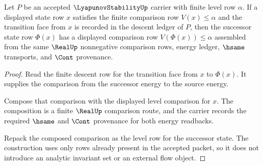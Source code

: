 \begin{theorem}
\label{thm:lyapunovstability-level-set-containment}
Let $P$ be an accepted $\LyapunovStabilityUp$ carrier with finite level row $\alpha$. If a displayed state row $x$ satisfies the finite comparison row $V(x)\leq \alpha$ and the transition face from $x$ is recorded in the descent ledger of $P$, then the successor state row $\Phi(x)$ has a displayed comparison row $V(\Phi(x))\leq \alpha$ assembled from the same $\RealUp$ nonnegative comparison rows, energy ledger, $\hsame$ transports, and $\Cont$ provenance.
\end{theorem}
\begin{proof}
Read the finite descent row for the transition face from $x$ to $\Phi(x)$. It supplies the comparison from the successor energy to the source energy.

Compose that comparison with the displayed level comparison for $x$. The composition is a finite $\RealUp$ comparison route, and the carrier records the required $\hsame$ and $\Cont$ provenance for both energy readbacks.

Repack the composed comparison as the level row for the successor state. The construction uses only rows already present in the accepted packet, so it does not introduce an analytic invariant set or an external flow object.
\end{proof}

